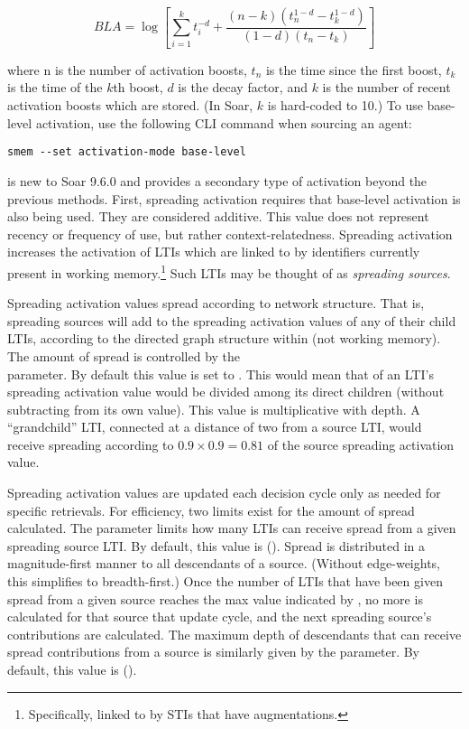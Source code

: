 $$BLA = \log \left[ \sum\limits_{i=1}^{k} t_i^{-d} + \dfrac{(n-k)(t_n^{1-d} - t_k^{1-d})}{(1-d)(t_n-t_k)} \right]$$

where n is the number of activation boosts, $t_n$ is the time since the first boost, $t_k$ is the time of the $k$th boost, $d$ is the decay factor, and $k$ is the number of recent activation boosts which are stored. (In Soar, $k$ is hard-coded to 10.) To use base-level activation, use the following CLI command when sourcing an agent:

\begin{verbatim}
smem --set activation-mode base-level
\end{verbatim}

 is new to Soar 9.6.0 and provides a secondary type of activation beyond the previous methods. First, spreading activation requires that base-level activation is also being used. They are considered additive. This value does not represent recency or frequency of use, but rather context-relatedness. Spreading activation increases the activation of LTIs which are linked to by identifiers currently present in working memory.\footnote{
	Specifically, linked to by STIs that have augmentations.} 
Such LTIs may be thought of as \textit{spreading sources}.

Spreading activation values spread according to network structure. That is, spreading sources will add to the spreading activation values of any of their child LTIs, according to the directed graph structure within  (not working memory).
The amount of spread is controlled by the \\
 parameter. By default this value is set to . This would mean that  of an LTI's spreading activation value would be divided among its direct children (without subtracting from its own value). This value is multiplicative with depth. A ``grandchild'' LTI, connected at a distance of two from a source LTI, would receive spreading according to $0.9\times 0.9 = 0.81$ of the source spreading activation value.

Spreading activation values are updated each decision cycle only as needed for specific  retrievals. For efficiency, two limits exist for the amount of spread calculated. The  parameter limits how many LTIs can receive spread from a given spreading source LTI. By default, this value is (). Spread is distributed in a magnitude-first manner to all descendants of a source. (Without edge-weights, this simplifies to breadth-first.) Once the number of LTIs that have been given spread from a given source reaches the max value indicated by , no more is calculated for that source that update cycle, and the next spreading source's contributions are calculated. The maximum depth of descendants that can receive spread contributions from a source is similarly given by the  parameter. By default, this value is ().

